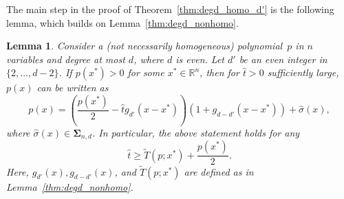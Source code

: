 \documentclass[12pt]{article}
\newcommand{\reals}{\mathbb{R}}
\newcommand{\SOS}{\mathbf{\Sigma}}
\newtheorem{lemma}[theorem]{Lemma}  %
\theoremstyle{remark}
\begin{document}

The main step in the proof of Theorem~\ref{thm:degd_homo_d'} is the following lemma, which builds on Lemma~\ref{thm:degd_nonhomo}.




\begin{lemma}\label{thm:degd_nonhomo_d'}
Consider a (not necessarily homogeneous) polynomial~$p$ in $n$ variables and degree at most $d$, where $d$ is even. Let $d'$ be an even integer in $\{2,\ldots,d-2\}$. If $p(x^*)>0$ for some $x^*\in\reals^n$, then for $\hat{t}>0$ sufficiently large, $p(x)$ can be written as
\[p(x)=\left(\frac{p(x^*)}{2}-\hat{t}g_{d'}(x-x^*)\right)\left(1+g_{d-d'}(x-x^*)\right)+\hat{\sigma}(x),\]
where $\hat{\sigma}(x)\in\SOS_{n,d}$. In particular, the above statement holds for any 
\[\hat{t}\ge \tilde{T}(p;x^*)+\frac{p(x^*)}{2}.\]
Here, $g_{d'}(x), g_{d-d'}(x)$, and $\tilde{T}(p;x^*)$ are defined as in Lemma~\ref{thm:degd_nonhomo}.
\end{lemma}
\end{document}
